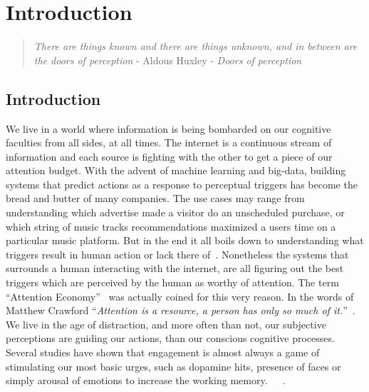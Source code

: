 
\chapter{Introduction}  %
\label{chap:Intro}

\graphicspath{{Chapter1/Figures/} {Chapter1/Figures}}
\begin{quote}
\textsl{There are things known and there are things unknown, and in between are the doors of perception} - Aldous Huxley - \textsl{Doors of perception}
\end{quote}


\section{Introduction}

We live in a world where information is being bombarded on our cognitive faculties from all sides, at all times. The internet is a continuous stream of information and each source is fighting with the other to get a piece of our attention budget. 
With the advent of machine learning and big-data, building systems that predict actions as a response to perceptual triggers has become the bread and butter of many companies. The use cases may range from understanding which advertise made a visitor do an unscheduled purchase, or which string of music tracks recommendations maximized a users time on a particular music platform. But in the end it all boils down to understanding what triggers result in human action or lack there of~\cite{song2012survey}. Nonetheless the systems that surrounds a human interacting with the internet, are all figuring out the best triggers which are perceived by the human as worthy of attention. 
The term ``Attention Economy''~\cite{davenport2001attention} was actually coined for this very reason. In the words of Matthew Crawford ``\textit{Attention is a resource, a person has only so much of it.}''~\cite{MatthewCrawford}. We live in the age of distraction, and more often than not, our subjective perceptions are guiding our actions, than our conscious cognitive processes. Several studies have shown that engagement is almost always a game of stimulating our most basic urges, such as dopamine hits, presence of faces or simply arousal of emotions to increase the working memory.~\cite{bakhshi2014faces,joglekar2017like}~\cite{schupp2006emotion}~\cite{soat2015social}. 

